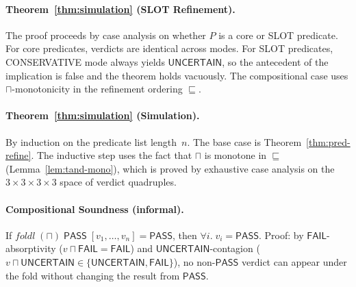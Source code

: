 \documentclass[acmsmall,review,anonymous]{acmart}
\newcommand{\PASS}{\ensuremath{\mathsf{PASS}}\xspace}
\newcommand{\FAIL}{\ensuremath{\mathsf{FAIL}}\xspace}
\newcommand{\UNCERTAIN}{\ensuremath{\mathsf{UNCERTAIN}}\xspace}
\newcommand{\tand}{\sqcap}
\newcommand{\pred}{P}
\begin{document}
\paragraph{Theorem~\ref{thm:simulation} (SLOT Refinement).}
The proof proceeds by case analysis on whether $\pred$ is a core or
SLOT predicate.
For core predicates, verdicts are identical across modes.
For SLOT predicates, CONSERVATIVE mode always yields \UNCERTAIN, so
the antecedent of the implication is false and the theorem holds
vacuously.
The compositional case uses $\tand$-monotonicity in the refinement
ordering $\sqsubseteq$.

\paragraph{Theorem~\ref{thm:simulation} (Simulation).}
By induction on the predicate list length~$n$.
The base case is Theorem~\ref{thm:pred-refine}.
The inductive step uses the fact that $\tand$ is monotone in
$\sqsubseteq$ (Lemma~\ref{lem:tand-mono}), which is proved by
exhaustive case analysis on the $3 \times 3 \times 3 \times 3$ space
of verdict quadruples.

\paragraph{Compositional Soundness (informal).}
If $\mathit{foldl}\;(\tand)\;\PASS\;[v_1, \ldots, v_n] = \PASS$,
then $\forall i.\; v_i = \PASS$.
Proof: by \FAIL-absorptivity ($v \tand \FAIL = \FAIL$) and
\UNCERTAIN-contagion ($v \tand \UNCERTAIN \in \{\UNCERTAIN, \FAIL\}$),
no non-\PASS{} verdict can appear under the fold without changing the
result from \PASS.





\end{document}
